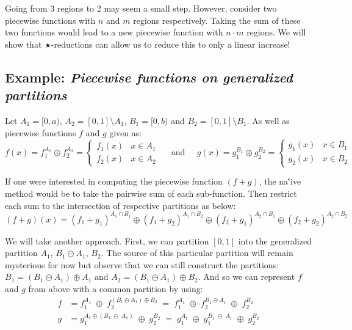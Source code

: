 Going from 3 regions to 2 may seem a small step.
However, consider two piecewise functions with $n$ and $m$ regions respectively.
Taking the sum of these two functions would lead to a new piecewise function with $n\cdot m$ regions.
We will show that $\star$-reductions can allow us to reduce this to only a linear increase!


\subsection{Example: \emph{Piecewise functions on generalized partitions}} 
Let $A_1 = [0,a)$, $A_2 = [0,1] \setminus A_1$, $B_1 = [0,b)$ and $B_2 = [0,1] \setminus B_1$.
As well as piecewise functions $f$ and $g$ given as:
\begin{equation*}
	f(x) = f_1^{A_1} \oplus f_2^{A_2}
		= \begin{cases}
			f_1(x) & x \in A_1 \\
			f_2(x) & x \in A_2
		\end{cases}
	\;\;\;\;\; \text{and} \;\;\;\;\;
	g(x) = g_1^{B_1} \oplus g_2^{B_2}
		= \begin{cases}
			g_1(x) & x \in B_1 \\
			g_2(x) & x \in B_2
		\end{cases}
\end{equation*}

If one were interested in computing the piecewise function $(f+g)$, the na\''{i}ve method would be to take the pairwise
sum of each sub-function. 
Then restrict each sum to the intersection of respective partitions as below:
\begin{equation}
	(f+g)(x) = (f_1 + g_1)^{A_1 \cap B_1} 
		\oplus (f_1 + g_2)^{A_1 \cap B_2} 
		\oplus (f_2 + g_1)^{A_2 \cap B_1}
		\oplus (f_2 + g_2)^{A_2 \cap B_2}
\end{equation}

We will take another approach.
First, we can partition $[0,1]$ into the generalized partition $A_1$, $B_1 \ominus A_1$, $B_2$.
The source of this particular partition will remain mysterious for now but observe that we can still construct the partitions:
$B_1 = (B_1 \ominus A_1) \oplus A_1$ and $A_2 = (B_1 \ominus A_1) \oplus B_2$.
And so we can represent $f$ and $g$ from above with a common partition by using:
\begin{align}
	f &=  f_1^{A_1} \;\oplus\; f_2^{(B_1 \ominus A_1) \oplus B_2}
		\;=\; f_1^{A_1} \;\oplus\; f_2^{B_1 \ominus A_1} \;\oplus\; f_2^{B_2} \\
	g &= g_1^{A_1 \oplus (B_1 \;\ominus\; A_1)} \;\oplus\; g_2^{B_2}
		\;=\; g_1^{A_1} \;\oplus\; g_1^{B_1 \;\ominus\; A_1} \;\oplus\; g_2^{B_2}
\end{align}

